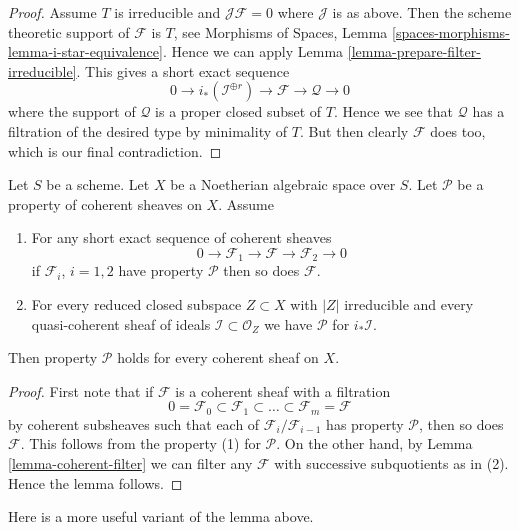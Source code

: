 \begin{proof}
\medskip\noindent
Assume $T$ is irreducible and $\mathcal{J}\mathcal{F} = 0$ where
$\mathcal{J}$ is as above. Then the scheme theoretic support of
$\mathcal{F}$ is $T$, see
Morphisms of Spaces, Lemma \ref{spaces-morphisms-lemma-i-star-equivalence}.
Hence we can apply Lemma \ref{lemma-prepare-filter-irreducible}.
This gives a short exact sequence
$$
0 \to
i_*(\mathcal{I}^{\oplus r}) \to
\mathcal{F} \to
\mathcal{Q} \to 0
$$
where the support of $\mathcal{Q}$ is a proper closed subset of $T$.
Hence we see that $\mathcal{Q}$ has a filtration of the desired type
by minimality of $T$. But then clearly $\mathcal{F}$ does too, which is
our final contradiction.
\end{proof}

\begin{lemma}
\label{lemma-property-initial}
Let $S$ be a scheme. Let $X$ be a Noetherian algebraic space over $S$.
Let $\mathcal{P}$ be a property of coherent sheaves on $X$. Assume
\begin{enumerate}
\item For any short exact sequence of coherent sheaves
$$
0 \to \mathcal{F}_1 \to \mathcal{F} \to \mathcal{F}_2 \to 0
$$
if $\mathcal{F}_i$, $i = 1, 2$ have property $\mathcal{P}$
then so does $\mathcal{F}$.
\item For every reduced closed subspace $Z \subset X$ with $|Z|$ irreducible
and every quasi-coherent sheaf of ideals $\mathcal{I} \subset \mathcal{O}_Z$
we have $\mathcal{P}$ for $i_*\mathcal{I}$.
\end{enumerate}
Then property $\mathcal{P}$ holds for every coherent sheaf on $X$.
\end{lemma}

\begin{proof}
First note that if $\mathcal{F}$ is a coherent sheaf with a filtration
$$
0 = \mathcal{F}_0 \subset \mathcal{F}_1 \subset
\ldots \subset \mathcal{F}_m = \mathcal{F}
$$
by coherent subsheaves such that each of $\mathcal{F}_i/\mathcal{F}_{i - 1}$
has property $\mathcal{P}$, then so does $\mathcal{F}$.
This follows from the property (1) for $\mathcal{P}$.
On the other hand, by Lemma \ref{lemma-coherent-filter}
we can filter any $\mathcal{F}$
with successive subquotients as in (2).
Hence the lemma follows.
\end{proof}

\noindent
Here is a more useful variant of the lemma above.

